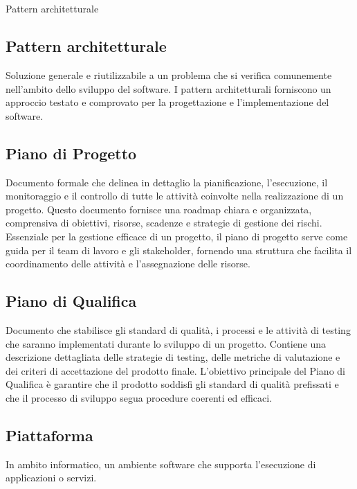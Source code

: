 
\section{}

\hypertarget{sec:pattern_architetturale}{Pattern architetturale}
\subsection*{Pattern architetturale}
Soluzione generale e riutilizzabile a un problema che si verifica comunemente nell’ambito dello sviluppo del software. I pattern 
architetturali forniscono un approccio testato e comprovato per la progettazione e l’implementazione del software.


\subsection*{Piano di Progetto}
Documento formale che delinea in dettaglio la pianificazione, l’esecuzione, il monitoraggio e il controllo di tutte le attività coinvolte nella 
realizzazione di un progetto. Questo documento fornisce una roadmap chiara e organizzata, comprensiva di obiettivi, risorse, scadenze e strategie di 
gestione dei rischi. Essenziale per la gestione efficace di un progetto, il piano di progetto serve come guida per il team di lavoro e gli stakeholder, 
fornendo una struttura che facilita il coordinamento delle attività e l’assegnazione delle risorse.

\subsection*{Piano di Qualifica}
Documento che stabilisce gli standard di qualità, i processi e le attività di testing che saranno implementati durante lo sviluppo di un progetto. 
Contiene una descrizione dettagliata delle strategie di testing, delle metriche di valutazione e dei criteri di accettazione del prodotto finale. 
L’obiettivo principale del Piano di Qualifica è garantire che il prodotto soddisfi gli standard di qualità prefissati e che il processo di sviluppo 
segua procedure coerenti ed efficaci.

\hypertarget{sec:piattaforma}{}
\subsection*{Piattaforma}
In ambito informatico, un ambiente software che supporta l’esecuzione di applicazioni o servizi.

